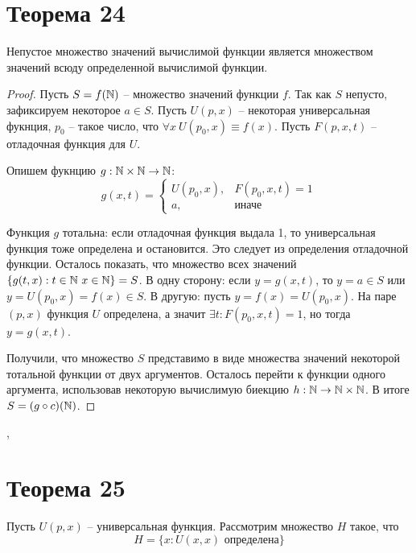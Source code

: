 \documentclass[a4paper,12pt]{article}
\begin{document}
    \section{Теорема 24}
    \begin{theorem}
    Непустое множество значений вычислимой функции является множеством значений всюду определенной вычислимой функции.    
    \end{theorem}
    \begin{proof}
        Пусть $S = f(\mathbb{N})$ -- множество значений функции $f$. Так как $S$ непусто, зафиксируем некоторое $a \in S$. Пусть $U(p, x)$ -- некоторая универсальная фукнция, $p_0$ -- такое число, что $\forall x \ U(p_0, x) \equiv f(x)$. Пусть $F(p, x, t)$ -- отладочная функция для $U$.
        
        Опишем фукнцию $g : \mathbb{N} \times \mathbb{N} \rightarrow \mathbb{N}$:
        \[
        g(x, t) =
        \begin{cases}
            U(p_0, x), & F(p_0, x, t) = 1 \\
            a, & \text{иначе}
        \end{cases}
        \]
        
        Функция $g$ тотальна: если отладочная функция выдала 1, то универсальная функция тоже определена и остановится. Это следует из определения отладочной функции. Осталось показать, что множество всех значений $\{g(t, x) : t \in \mathbb{N} \ x \in \mathbb{N} \} = S$. В одну сторону: если $y = g(x, t)$, то $y = a \in S$ или $y = U(p_0, x) = f(x) \in S$. В другую: пусть $y = f(x) = U(p_0, x)$. На паре $(p, x)$ функция $U$ определена, а значит $\exists t: F(p_0, x, t) = 1$, но тогда $y = g(x, t)$. 
        
        Получили, что множество $S$ представимо в виде множества значений некоторой тотальной функции от двух аргументов. Осталось перейти к функции одного аргумента, использовав некоторую вычислимую биекцию $h: \mathbb{N} \rightarrow \mathbb{N} \times \mathbb{N}$. В итоге $S = (g \circ c)(\mathbb{N})$.
        
        
    \end{proof}
	\sep	
	
	\section{Теорема 25}
	Пусть $U(p, x)$ -- универсальная функция. Рассмотрим множество $H$ такое, что
    \[
    H = \{ x : U(x, x) \text{ определена} \}
    \]
	
\end{document}
